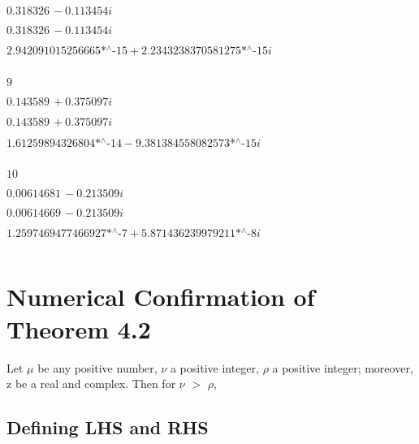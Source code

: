 \noindent\(0.318326\, -0.113454 i\)

\noindent\(0.318326\, -0.113454 i\)

\noindent\(\text{2.942091015256665$\grave{ }$*${}^{\wedge}$-15}+\text{2.2343238370581275$\grave{ }$*${}^{\wedge}$-15} i\)

\noindent\(\text{}\)

\noindent\(9\)

\noindent\(0.143589\, +0.375097 i\)

\noindent\(0.143589\, +0.375097 i\)

\noindent\(\text{1.61259894326804$\grave{ }$*${}^{\wedge}$-14}-\text{9.381384558082573$\grave{ }$*${}^{\wedge}$-15} i\)

\noindent\(\text{}\)

\noindent\(10\)

\noindent\(0.00614681\, -0.213509 i\)

\noindent\(0.00614669\, -0.213509 i\)

\noindent\(\text{1.2597469477466927$\grave{ }$*${}^{\wedge}$-7}+\text{5.871436239979211$\grave{ }$*${}^{\wedge}$-8} i\)

\noindent\(\text{}\)


\section*{Numerical Confirmation of Theorem 4.2}

Let $\mu $ be any positive number, $\nu $ a positive integer, $\rho $ a positive integer; moreover, z be a real and complex. Then for $\nu $ $>$
$\rho $,
\subsection*{Defining LHS and RHS}

